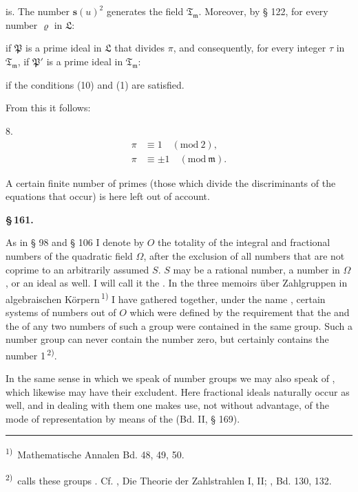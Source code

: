 is. The number $\boldsymbol{s}(u)^2$ generates the field $\mathfrak{T}_{\mathfrak{m}}$. Moreover,
by § 122, for every number $\varrho$ in $\mathfrak{L}$:


if $\mathfrak{P}$ is a prime ideal in $\mathfrak{L}$ that divides $\pi$, and consequently,
for every integer $\tau$ in $\mathfrak{T}_{\mathfrak{m}}$, if $\mathfrak{P}'$ is a prime ideal in $\mathfrak{T}_{\mathfrak{m}}$:


if the conditions (10) and (1) are satisfied.

From this it follows:

8. 
\[
\begin{aligned}
\pi &\equiv 1 \quad (\mathrm{mod}\ 2), \\
\pi &\equiv \pm 1 \quad (\mathrm{mod}\ \mathfrak{m}).
\end{aligned}
\]

A certain finite number of primes (those which divide the
discriminants of the equations that occur) is here left out of
account.

\begin{center}
\textbf{\S\,161.\qquad {}}
\end{center}

As in § 98 and § 106 I denote by $O$ the totality of the
integral and fractional numbers of the quadratic field $\Omega$,
after the exclusion of all numbers that are not coprime to an
arbitrarily assumed $S$. $S$ may be a rational number, a number
in $\Omega$, or an ideal as well. I will call it the .
In the three memoirs \glqq über Zahlgruppen in algebraischen
 Körpern\grqq{}\,\textsuperscript{1)} I have gathered together, under the name ,
certain systems of numbers out of $O$ which were defined by
the requirement that the  and the  of any two
numbers of such a group were contained in the same group.
Such a number group can never contain the number zero,
but certainly contains the number 1\,\textsuperscript{2)}.

In the same sense in which we speak of number groups we
may also speak of , which likewise may have their
excludent. Here fractional ideals naturally occur as well, and
in dealing with them one makes use, not without advantage, of the mode of representation
 by means of the  (Bd. II, § 169).

\begingroup
\footnotesize
\noindent\rule{4cm}{0.4pt}\par
\textsuperscript{1)}\, Mathematische Annalen Bd. 48, 49, 50.

\textsuperscript{2)}\,  calls these groups \glqq {}\grqq{}. Cf. , Die
Theorie der Zahlstrahlen I, II; , Bd. 130, 132.
\endgroup
